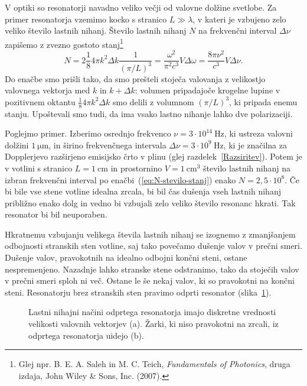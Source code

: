 V optiki so resonatorji navadno veliko večji
od valovne dolžine svetlobe. Za primer resonatorja vzemimo kocko s stranico $L\gg \lambda$, 
v kateri je vzbujeno zelo veliko število lastnih nihanj. Število lastnih nihanj $N$ 
na frekvenčni interval $\Delta \nu$ zapišemo z zvezno gostoto 
stanj\footnote{Glej npr. B. E. A. Saleh in M. C. Teich, 
{\it Fundamentals of Photonics}, druga izdaja, John Wiley \& Sons, Inc. (2007).}
\begin{equation}
N=2 \frac{1}{8} 4\pi k^{2}\Delta k \frac{1}{(\pi/L)^3}=\frac{\omega^{2}}{\pi^{2}c^{3}}V\Delta\omega=
\frac{8\pi \nu^{2}}{c^{3}}V\Delta\nu.
\label{eq:N-stevilo-stanj}
\end{equation}
Do enačbe smo prišli tako, da smo prešteli stoječa valovanja z velikostjo
valovnega vektorja med $k$ in $k+\Delta k$: volumen pripadajoče krogelne lupine v pozitivnem oktantu
$\frac{1}{8} 4\pi k^{2}\Delta k$ smo delili z volumnom $(\pi/L)^3$, ki pripada enemu stanju. 
Upoštevali smo tudi, da ima vsako lastno nihanje lahko dve polarizaciji.

Poglejmo primer. Izberimo osrednjo frekvenco $\nu=3\cdot10^{14}~\si{\hertz}$, ki
ustreza valovni dolžini $1~\si{\micro\metre}$, in širino frekvenčnega
intervala $\Delta\nu=3\cdot10^{9}~\si{\hertz}$, ki je značilna za Dopplerjevo
razširjeno emisijsko črto v plinu (glej razdelek~\ref{Razsiritev}). 
Potem je v votlini s stranico $L=1~\si{\centi\metre}$ 
in prostornino $V=1~\si{\centi\metre^3}$ število lastnih nihanj na izbran frekvenčni interval 
po enačbi~(\ref{eq:N-stevilo-stanj}) enako
$N=2,5\cdot10^{8}$. Če bi bile vse stene votline idealna zrcala,
bi bil čas dušenja vseh lastnih nihanj približno enako dolg in vedno bi vzbujali
zelo veliko število resonanc hkrati. Tak resonator bi bil neuporaben.

Hkratnemu vzbujanju velikega števila lastnih nihanj se izognemo z zmanjšanjem odbojnosti
stranskih sten votline, saj tako povečamo dušenje valov v prečni smeri.
Dušenje valov, pravokotnih na idealno odbojni končni steni, ostane nespremenjeno.
Nazadnje lahko stranske stene odstranimo, tako da stoječih valov v prečni smeri
sploh ni več. Ostane le še nekaj valov, ki so pravokotni na končni
steni. Resonatorju brez stranskih sten  pravimo odprti resonator 
(slika~\ref{fig:Odprt_resonator}).
\begin{figure}[h]
\centering
\def\svgwidth{110truemm} 

\caption{Lastni nihajni načini odprtega resonatorja imajo diskretne vrednosti
velikosti valovnih vektorjev (a). Žarki, ki niso pravokotni na zrcali, 
iz odprtega resonatorja uidejo (b).}
\label{fig:Odprt_resonator}
\end{figure}

